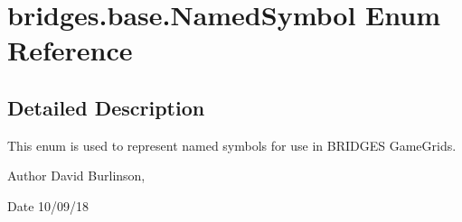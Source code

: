 \hypertarget{enumbridges_1_1base_1_1_named_symbol}{}\section{bridges.\+base.\+Named\+Symbol Enum Reference}
\label{enumbridges_1_1base_1_1_named_symbol}


\subsection{Detailed Description}
This enum is used to represent named symbols for use in B\+R\+I\+D\+G\+ES Game\+Grids. 

\begin{DoxyAuthor}{Author}
David Burlinson, 
\end{DoxyAuthor}
\begin{DoxyDate}{Date}
10/09/18 
\end{DoxyDate}

